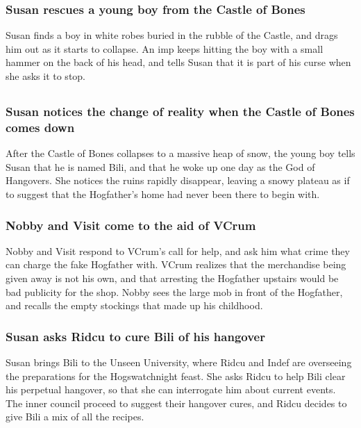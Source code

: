 \subsubsection{\Gls{Susan} rescues a young boy from the Castle of Bones}
\Gls{Susan} finds a boy in white robes buried in the rubble of the Castle, and drags him out as it
starts to collapse. An imp keeps hitting the boy with a small hammer on the back of his head, and
tells \Gls{Susan} that it is part of his curse when she asks it to stop.

\subsection{}
\subsubsection{\Gls{Susan} notices the change of reality when the Castle of Bones comes down}
After the Castle of Bones collapses to a massive heap of snow, the young boy tells \Gls{Susan} that
he is named \Gls{Bili}, and that he woke up one day as the God of Hangovers. She notices the ruins
rapidly disappear, leaving a snowy plateau as if to suggest that the Hogfather's home had never been
there to begin with.

\subsubsection{\Gls{Nobby} and \Gls{Visit} come to the aid of \Gls{VCrum}}
\Gls{Nobby} and \Gls{Visit} respond to \Gls{VCrum}'s call for help, and ask him what crime they
can charge the fake Hogfather with. \Gls{VCrum} realizes that the merchandise being given away is
not his own, and that arresting the Hogfather upstairs would be bad publicity for the shop.
\Gls{Nobby} sees the large mob in front of the Hogfather, and recalls the empty stockings that made
up his childhood.

\subsubsection{\Gls{Susan} asks \Gls{Ridcu} to cure \Gls{Bili} of his hangover}
\Gls{Susan} brings \Gls{Bili} to the Unseen University, where \Gls{Ridcu} and \Gls{Indef} are
overseeing the preparations for the Hogswatchnight feast. She asks \Gls{Ridcu} to help \Gls{Bili}
clear his perpetual hangover, so that she can interrogate him about current events. The inner
council proceed to suggest their hangover cures, and \Gls{Ridcu} decides to give \Gls{Bili} a mix
of all the recipes.

